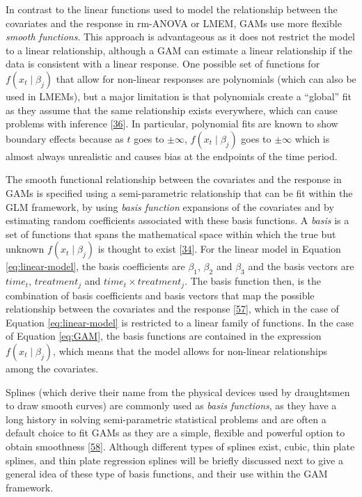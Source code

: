 \documentclass[
]{article}
\begin{document}
In contrast to the linear functions used to model the relationship between the covariates and the response in rm-ANOVA or LMEM, GAMs use more flexible \emph{smooth functions}. This approach is advantageous as it does not restrict the model to a linear relationship, although a GAM can estimate a linear relationship if the data is consistent with a linear response. One possible set of functions for \(f(x_t\mid \beta_j)\) that allow for non-linear responses are polynomials (which can also be used in LMEMs), but a major limitation is that polynomials create a ``global'' fit as they assume that the same relationship exists everywhere, which can cause problems with inference {[}\protect\hyperlink{ref-beck1998}{36}{]}. In particular, polynomial fits are known to show boundary effects because as \(t\) goes to \(\pm \infty\), \(f(x_t \mid \beta_j)\) goes to \(\pm \infty\) which is almost always unrealistic and causes bias at the endpoints of the time period.

The smooth functional relationship between the covariates and the response in GAMs is specified using a semi-parametric relationship that can be fit within the GLM framework, by using \emph{basis function} expansions of the covariates and by estimating random coefficients associated with these basis functions. A \emph{basis} is a set of functions that spans the mathematical space within which the true but unknown \(f(x_t\mid \beta_j)\) is thought to exist {[}\protect\hyperlink{ref-simpson2018}{34}{]}. For the linear model in Equation \eqref{eq:linear-model}, the basis coefficients are \(\beta_1\), \(\beta_2\) and \(\beta_3\) and the basis vectors are \(time_t\), \(treatment_j\) and \(time_t \times treatment_j\). The basis function then, is the combination of basis coefficients and basis vectors that map the possible relationship between the covariates and the response {[}\protect\hyperlink{ref-hefley2017}{57}{]}, which in the case of Equation \eqref{eq:linear-model} is restricted to a linear family of functions. In the case of Equation \eqref{eq:GAM}, the basis functions are contained in the expression \(f(x_t\mid \beta_j)\), which means that the model allows for non-linear relationships among the covariates.

Splines (which derive their name from the physical devices used by draughtsmen to draw smooth curves) are commonly used as \emph{basis functions}, as they have a long history in solving semi-parametric statistical problems and are often a default choice to fit GAMs as they are a simple, flexible and powerful option to obtain smoothness {[}\protect\hyperlink{ref-wegman1983}{58}{]}. Although different types of splines exist, cubic, thin plate splines, and thin plate regression splines will be briefly discussed next to give a general idea of these type of basis functions, and their use within the GAM framework.
\end{document}
